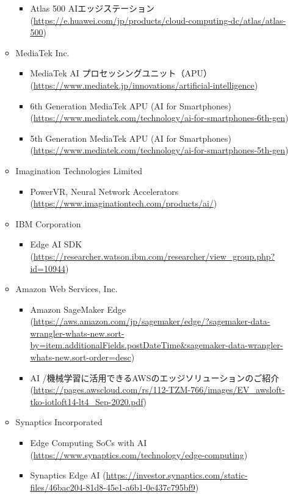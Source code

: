 \begin{itemize}
\begin{itemize}
		\begin{itemize}
			\item Atlas 500 AIエッジステーション (\url{https://e.huawei.com/jp/products/cloud-computing-dc/atlas/atlas-500})
		\end{itemize}
		\item MediaTek Inc.
		\begin{itemize}
			\item MediaTek AI プロセッシングユニット（APU） (\url{https://www.mediatek.jp/innovations/artificial-intelligence})
			\item 6th Generation MediaTek APU (AI for Smartphones) (\url{https://www.mediatek.com/technology/ai-for-smartphones-6th-gen})
			\item 5th Generation MediaTek APU (AI for Smartphones) (\url{https://www.mediatek.com/technology/ai-for-smartphones-5th-gen})
		\end{itemize}
		\item Imagination Technologies Limited
		\begin{itemize}
			\item PowerVR, Neural Network Accelerators (\url{https://www.imaginationtech.com/products/ai/})
		\end{itemize}
		\item IBM Corporation
		\begin{itemize}
			\item Edge AI SDK (\url{https://researcher.watson.ibm.com/researcher/view_group.php?id=10944})
		\end{itemize}
		\item Amazon Web Services, Inc.
		\begin{itemize}
			\item Amazon SageMaker Edge (\url{https://aws.amazon.com/jp/sagemaker/edge/?sagemaker-data-wrangler-whats-new.sort-by=item.additionalFields.postDateTime&sagemaker-data-wrangler-whats-new.sort-order=desc})
			\item AI /機械学習に活用できるAWSのエッジソリューションのご紹介 (\url{https://pages.awscloud.com/rs/112-TZM-766/images/EV_awsloft-tko-iotloft14-lt4_Sep-2020.pdf})
		\end{itemize}
		\item Synaptics Incorporated
		\begin{itemize}
			\item Edge Computing SoCs with AI (\url{https://www.synaptics.com/technology/edge-computing})
			\item Synaptics Edge AI (\url{https://investor.synaptics.com/static-files/46bac204-81d8-45e1-a6b1-0e437c795bf9})

\end{itemize}
\end{itemize}
\end{itemize}
